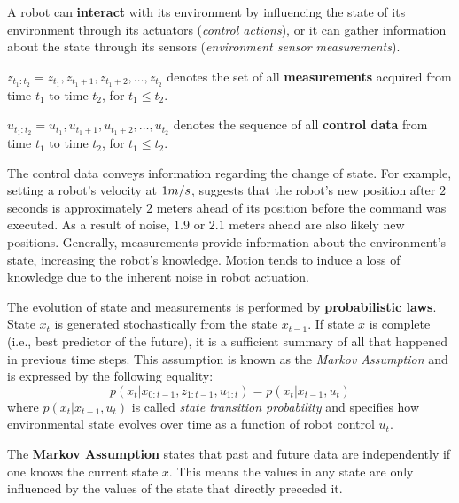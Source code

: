 A robot can \textbf{interact} with its environment by influencing the state of its environment through its actuators (\textit{control actions}), or it can gather information about the state through its sensors (\textit{environment sensor measurements}).
\begin{mydef}
$z_{t_1:t_2} = z_{t_1}, z_{t_1 + 1}, z_{t_1 + 2}, \hdots, z_{t_2}$ denotes the set of all \textbf{measurements} acquired from time $t_1$ to time $t_2$, for $t_1 \leq t_2$.
\end{mydef}
\begin{mydef}
$u_{t_1:t_2} = u_{t_1}, u_{t_1 + 1}, u_{t_1 + 2}, \hdots, u_{t_2}$ denotes the sequence of all \textbf{control data} from time $t_1$ to time $t_2$, for $t_1 \leq t_2$.
\end{mydef}
The control data conveys information regarding the change of state.
For example, setting a robot's velocity at $1 \small{m/s}$, suggests that the robot's new position after $2$ seconds is approximately $2$ meters ahead of its position before the command was executed.
As a result of noise, $1.9$ or $2.1$ meters ahead are also likely new positions.
Generally, measurements provide information about the environment's state, increasing the robot's knowledge.
Motion tends to induce a loss of knowledge due to the inherent noise in robot actuation. %

The evolution of state and measurements is performed by \textbf{probabilistic laws}.
State $x_t$ is generated stochastically from the state $x_{t-1}$.
If state $x$ is complete (i.e., best predictor of the future), it is a sufficient summary of all that happened in previous time steps.
This assumption is known as the \textit{Markov Assumption} and is expressed by the following equality:
\begin{equation}
\label{eq:background_state_trans_prob}
p(x_t | x_{0:t - 1}, z_{1:t - 1}, u_{1:t}) = p(x_t | x_{t-1}, u_t)
\end{equation}
where $p(x_t | x_{t-1}, u_t)$ is called \textit{state transition probability} and specifies how environmental state evolves over time as a function of robot control $u_t$.

\begin{mydef}
The \textbf{Markov Assumption} states that past and future data are independently if one knows the current state $x$. This means the values in any state are only influenced by the values of the state that directly preceded it.
\end{mydef}

